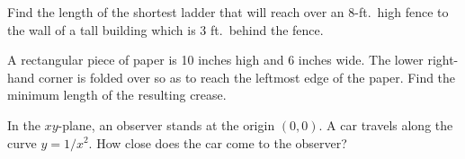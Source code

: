 \begin{multicols}{2}
\problem Find the length of the shortest ladder that will reach over an %
8-ft.~high fence to the wall of a tall building which is 3 ft.~behind the
fence.

\problem A rectangular piece of paper is 10 inches high and 6 inches %
wide. The lower right-hand corner is folded over so as to reach the
leftmost edge of the paper. Find the minimum length of the resulting
crease.








\problem In the $xy$-plane, an observer stands at the origin $(0,0)$. A car %
travels along the curve $y=1/x^2$. How close does the car come to the observer?





\end{multicols}
